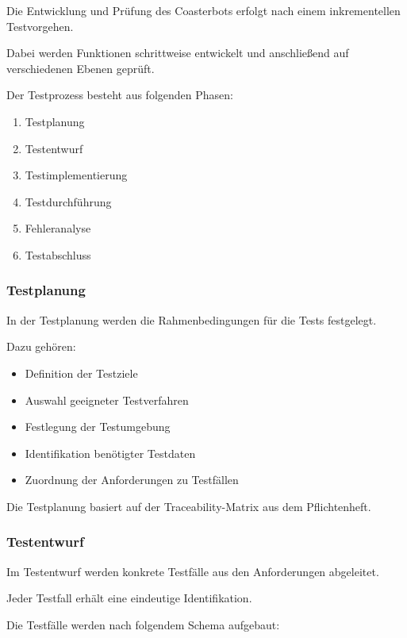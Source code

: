 \documentclass[
  a4paper,
  12pt,
  DIV=12,        %
  parskip=half,  %
  headings=small %
]{scrartcl}
\theoremstyle{definition}
\providecommand{\tightlist}{%
  \setlength{\itemsep}{0pt}\setlength{\parskip}{0pt}}
\theoremstyle{definition}
\begin{document}
Die Entwicklung und Prüfung des Coasterbots erfolgt nach einem
inkrementellen Testvorgehen.

Dabei werden Funktionen schrittweise entwickelt und anschließend auf
verschiedenen Ebenen geprüft.

Der Testprozess besteht aus folgenden Phasen:

\begin{enumerate}
\def\labelenumi{\arabic{enumi}.}
\tightlist
\item
  Testplanung
\item
  Testentwurf
\item
  Testimplementierung
\item
  Testdurchführung
\item
  Fehleranalyse
\item
  Testabschluss
\end{enumerate}

\subsubsection{Testplanung}\label{testplanung}

In der Testplanung werden die Rahmenbedingungen für die Tests
festgelegt.

Dazu gehören:

\begin{itemize}
\tightlist
\item
  Definition der Testziele
\item
  Auswahl geeigneter Testverfahren
\item
  Festlegung der Testumgebung
\item
  Identifikation benötigter Testdaten
\item
  Zuordnung der Anforderungen zu Testfällen
\end{itemize}

Die Testplanung basiert auf der Traceability-Matrix aus dem
Pflichtenheft.

\subsubsection{Testentwurf}\label{testentwurf}

Im Testentwurf werden konkrete Testfälle aus den Anforderungen
abgeleitet.

Jeder Testfall erhält eine eindeutige Identifikation.

Die Testfälle werden nach folgendem Schema aufgebaut:
\end{document}
